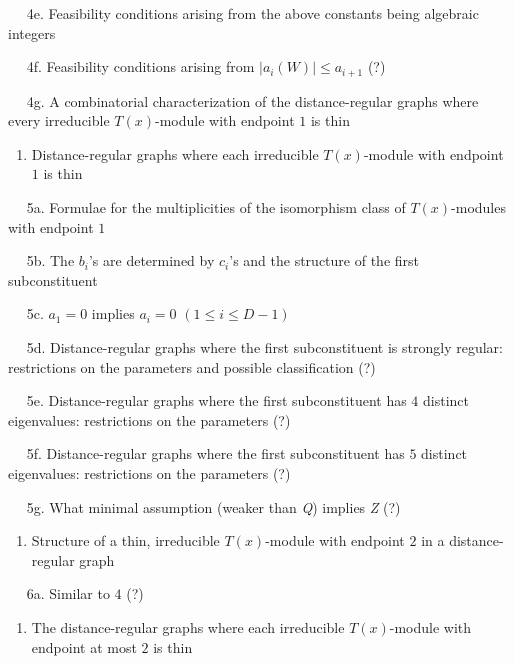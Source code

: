 \documentclass[
]{book}
\providecommand{\tightlist}{%
  \setlength{\itemsep}{0pt}\setlength{\parskip}{0pt}}
\theoremstyle{definition}
\theoremstyle{definition}
\theoremstyle{definition}
\theoremstyle{definition}
\theoremstyle{remark}
\begin{document}
\(\quad\) 4e. Feasibility conditions arising from the above constants being algebraic integers

\(\quad\) 4f. Feasibility conditions arising from \(|a_i(W)|\leq a_{i+1}\) (?)

\(\quad\) 4g. A combinatorial characterization of the distance-regular graphs where every irreducible \(T(x)\)-module with endpoint \(1\) is thin

\begin{enumerate}
\def\labelenumi{\arabic{enumi}.}
\setcounter{enumi}{4}
\tightlist
\item
  Distance-regular graphs where each irreducible \(T(x)\)-module with endpoint \(1\) is thin
\end{enumerate}

\(\quad\) 5a. Formulae for the multiplicities of the isomorphism class of \(T(x)\)-modules with endpoint \(1\)

\(\quad\) 5b. The \(b_i\)'s are determined by \(c_i\)'s and the structure of the first subconstituent

\(\quad\) 5c. \(a_1 = 0\) implies \(a_i = 0\) \((1\leq i\leq D-1)\)

\(\quad\) 5d. Distance-regular graphs where the first subconstituent is strongly regular: restrictions on the parameters and possible classification (?)

\(\quad\) 5e. Distance-regular graphs where the first subconstituent has \(4\) distinct eigenvalues: restrictions on the parameters (?)

\(\quad\) 5f. Distance-regular graphs where the first subconstituent has \(5\) distinct eigenvalues: restrictions on the parameters (?)

\(\quad\) 5g. What minimal assumption (weaker than \emph{Q}) implies \emph{Z} (?)

\begin{enumerate}
\def\labelenumi{\arabic{enumi}.}
\setcounter{enumi}{5}
\tightlist
\item
  Structure of a thin, irreducible \(T(x)\)-module with endpoint \(2\) in a distance-regular graph
\end{enumerate}

\(\quad\) 6a. Similar to \(4\) (?)

\begin{enumerate}
\def\labelenumi{\arabic{enumi}.}
\setcounter{enumi}{6}
\tightlist
\item
  The distance-regular graphs where each irreducible \(T(x)\)-module with endpoint at most \(2\) is thin
\end{enumerate}
\end{document}
